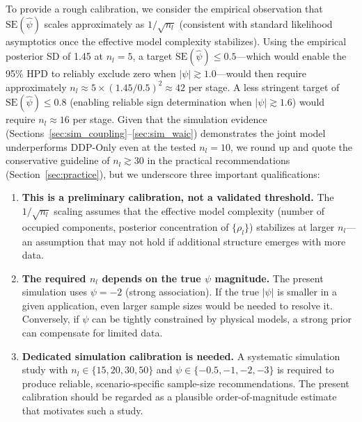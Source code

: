 \documentclass[a4paper,fleqn,longmktitle]{cas-sc}
\begin{document}
To provide a rough calibration, we consider the empirical observation that $\mathrm{SE}(\widehat{\psi})$ scales approximately as $1/\sqrt{n_l}$ (consistent with standard likelihood asymptotics once the effective model complexity stabilizes). Using the empirical posterior SD of 1.45 at $n_l=5$, a target $\mathrm{SE}(\widehat{\psi}) \leq 0.5$---which would enable the 95\% HPD to reliably exclude zero when $|\psi| \gtrsim 1.0$---would then require approximately $n_l \approx 5 \times (1.45/0.5)^2 \approx 42$ per stage. A less stringent target of $\mathrm{SE}(\widehat{\psi}) \leq 0.8$ (enabling reliable sign determination when $|\psi| \gtrsim 1.6$) would require $n_l \approx 16$ per stage. Given that the simulation evidence (Sections~\ref{sec:sim_coupling}--\ref{sec:sim_waic}) demonstrates the joint model underperforms DDP-Only even at the tested $n_l=10$, we round up and quote the conservative guideline of $n_l \gtrsim 30$ in the practical recommendations (Section~\ref{sec:practice}), but we underscore three important qualifications:

\begin{enumerate}
    \item \textbf{This is a preliminary calibration, not a validated threshold.} The $1/\sqrt{n_l}$ scaling assumes that the effective model complexity (number of occupied components, posterior concentration of $\{\rho_l\}$) stabilizes at larger $n_l$---an assumption that may not hold if additional structure emerges with more data.
    \item \textbf{The required $n_l$ depends on the true $\psi$ magnitude.} The present simulation uses $\psi=-2$ (strong association). If the true $|\psi|$ is smaller in a given application, even larger sample sizes would be needed to resolve it. Conversely, if $\psi$ can be tightly constrained by physical models, a strong prior can compensate for limited data.
    \item \textbf{Dedicated simulation calibration is needed.} A systematic simulation study with $n_l \in \{15, 20, 30, 50\}$ and $\psi \in \{-0.5, -1, -2, -3\}$ is required to produce reliable, scenario-specific sample-size recommendations. The present calibration should be regarded as a plausible order-of-magnitude estimate that motivates such a study.
\end{enumerate}
\end{document}
